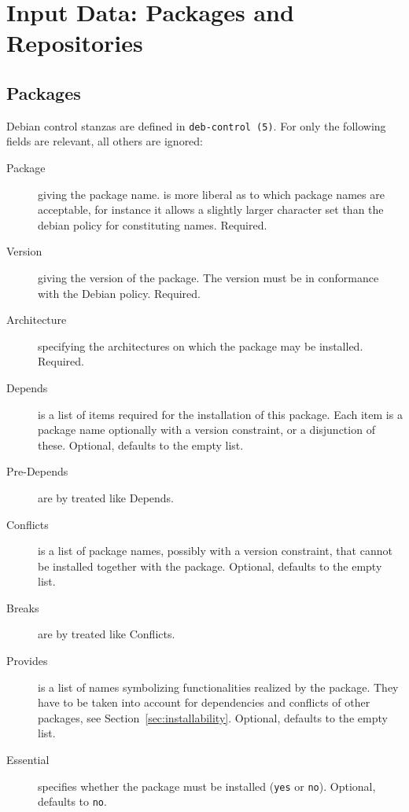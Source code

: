 
\section{Input Data: Packages and Repositories}
\label{sec:data}
\subsection{Packages}
\label{sec:packages}
Debian control stanzas are defined in \texttt{deb-control~(5)}. For
\debcheck{} only the following fields are relevant, all others are
ignored:
\begin{description}
\item[Package] giving the package name. \debcheck{} is more liberal as
  to which package names are acceptable, for instance it allows a
  slightly larger character set than the debian policy for
  constituting names. Required.
\item[Version] giving the version of the package. The version must be
  in conformance with the Debian policy. Required.
\item[Architecture] specifying the architectures on which the package
  may be installed. Required.
\item[Depends] is a list of items required for the installation of
  this package. Each item is a package name optionally with a version
  constraint, or a disjunction of these. Optional, defaults to the
  empty list.
\item[Pre-Depends] are by \debcheck{} treated like Depends.
\item[Conflicts] is a list of package names, possibly with a version
  constraint, that cannot be installed together with the package. Optional,
  defaults to the empty list.
\item[Breaks] are by \debcheck{} treated like Conflicts.
\item[Provides] is a list of names symbolizing functionalities
  realized by the package. They have to be taken into account for
  dependencies and conflicts of other packages, see
  Section~\ref{sec:installability}. Optional, defaults to the empty
  list.
\item[Essential] specifies whether the package must be installed
  (\texttt{yes} or \texttt{no}). Optional, defaults to \texttt{no}.
\end{description}

